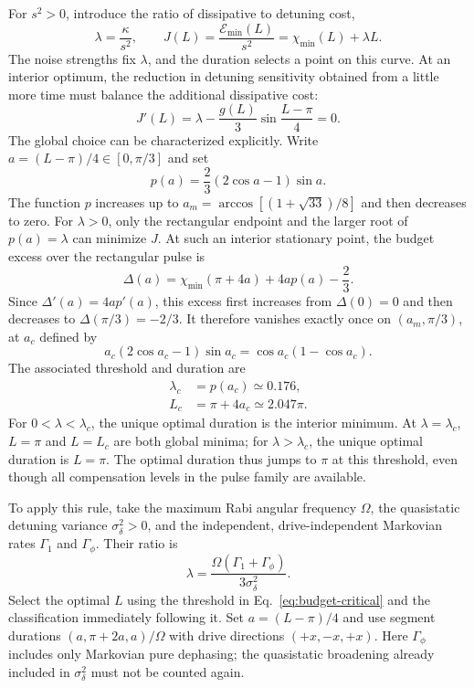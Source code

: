 \documentclass[12pt]{iopjournal}
\begin{document}
For $s^2>0$, introduce the ratio of dissipative to detuning cost,
\begin{equation*}
 \lambda=\frac{\kappa}{s^2},\qquad
 J(L)=\frac{\mathcal E_{\min}(L)}{s^2}
     =\chi_{\min}(L)+\lambda L.
\end{equation*}
The noise strengths fix $\lambda$, and the duration selects a point
on this curve. At an interior optimum, the reduction in detuning
sensitivity obtained from a little more time must balance the
additional dissipative cost:
\begin{equation}
 J'(L)=\lambda-\frac{g(L)}{3}\sin\frac{L-\pi}{4}=0.
 \label{eq:working-point}
\end{equation}
The global choice can be characterized explicitly. Write
$a=(L-\pi)/4\in[0,\pi/3]$ and set
\begin{equation}
 p(a)=\frac23(2\cos a-1)\sin a.
 \label{eq:budget-slope}
\end{equation}
The function $p$ increases up to
$a_m=\arccos[(1+\sqrt{33})/8]$ and then decreases to zero.
For $\lambda>0$, only the rectangular endpoint and the larger root
of $p(a)=\lambda$ can minimize $J$. At such an interior stationary
point, the budget excess over the rectangular pulse is
\begin{equation*}
 \Delta(a)=\chi_{\min}(\pi+4a)+4a p(a)-\frac23.
\end{equation*}
Since $\Delta'(a)=4a p'(a)$, this excess first increases from
$\Delta(0)=0$ and then decreases to $\Delta(\pi/3)=-2/3$.
It therefore vanishes exactly once on $(a_m,\pi/3)$, at $a_c$ defined by
\begin{equation}
 a_c(2\cos a_c-1)\sin a_c=\cos a_c(1-\cos a_c).
 \label{eq:budget-transition}
\end{equation}
The associated threshold and duration are
\begin{equation}
 \begin{aligned}
 \lambda_c&=p(a_c)\simeq0.176,\\
 L_c&=\pi+4a_c\simeq2.047\pi.
 \end{aligned}
 \label{eq:budget-critical}
\end{equation}
For $0<\lambda<\lambda_c$, the unique optimal duration is the
interior minimum. At $\lambda=\lambda_c$, $L=\pi$ and $L=L_c$
are both global minima; for $\lambda>\lambda_c$, the unique optimal
duration is $L=\pi$. The optimal duration thus jumps to
$\pi$ at this threshold, even though all compensation levels in the
pulse family are available.

To apply this rule, take the maximum Rabi angular frequency $\Omega$,
the quasistatic detuning variance $\sigma_\delta^2>0$, and the
independent, drive-independent Markovian rates $\Gamma_1$ and
$\Gamma_\phi$. Their ratio is
\begin{equation*}
 \lambda=\frac{\Omega(\Gamma_1+\Gamma_\phi)}{3\sigma_\delta^2}.
\end{equation*}
Select the optimal $L$ using the threshold in
Eq.~\eqref{eq:budget-critical} and the classification immediately
following it. Set $a=(L-\pi)/4$ and use segment durations
$(a,\pi+2a,a)/\Omega$ with drive directions $(+x,-x,+x)$.
Here $\Gamma_\phi$ includes only Markovian pure dephasing; the
quasistatic broadening already included in $\sigma_\delta^2$ must
not be counted again.
\end{document}
